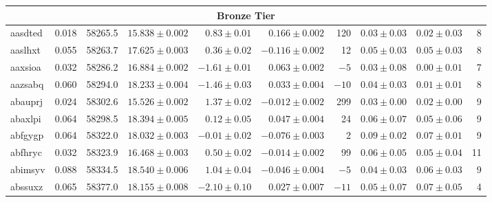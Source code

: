 \documentclass[twocolumn,twocolappendix, linenumbers]{aastex631} %
\begin{document}
\begin{table}[t]
\begin{tabular}{ |l|r|r|r|r|r|r|r|r|r| }
 \hline
 \multicolumn{10}{|c|}{Bronze Tier} \\
 \hline
aasdted & 0.018 & 58265.5 & $15.838 \pm 0.002$ & $0.83 \pm 0.01$ & $0.166 \pm 0.002$ & 120 & $0.03 \pm 0.03$ & $0.02 \pm 0.03$ & 8 \\
aaslhxt & 0.055 & 58263.7 & $17.625 \pm 0.003$ & $0.36 \pm 0.02$ & $-0.116 \pm 0.002$ & 12 & $0.05 \pm 0.03$ & $0.05 \pm 0.03$ & 8 \\
aaxsioa & 0.032 & 58286.2 & $16.884 \pm 0.002$ & $-1.61 \pm 0.01$ & $0.063 \pm 0.002$ & $-5$ & $0.03 \pm 0.08$ & $0.00 \pm 0.01$ & 7 \\
aazsabq & 0.060 & 58294.0 & $18.233 \pm 0.004$ & $-1.46 \pm 0.03$ & $0.033 \pm 0.004$ & $-10$ & $0.04 \pm 0.03$ & $0.01 \pm 0.01$ & 8 \\
abauprj & 0.024 & 58302.6 & $15.526 \pm 0.002$ & $1.37 \pm 0.02$ & $-0.012 \pm 0.002$ & 299 & $0.03 \pm 0.00$ & $0.02 \pm 0.00$ & 9 \\
abaxlpi & 0.064 & 58298.5 & $18.394 \pm 0.005$ & $0.12 \pm 0.05$ & $0.047 \pm 0.004$ & 24 & $0.06 \pm 0.07$ & $0.05 \pm 0.06$ & 9 \\
abfgygp & 0.064 & 58322.0 & $18.032 \pm 0.003$ & $-0.01 \pm 0.02$ & $-0.076 \pm 0.003$ & 2 & $0.09 \pm 0.02$ & $0.07 \pm 0.01$ & 9 \\
abfhryc & 0.032 & 58323.9 & $16.468 \pm 0.003$ & $0.50 \pm 0.02$ & $-0.014 \pm 0.002$ & 99 & $0.06 \pm 0.05$ & $0.05 \pm 0.04$ & 11 \\
abimsyv & 0.088 & 58334.5 & $18.540 \pm 0.006$ & $1.04 \pm 0.04$ & $-0.046 \pm 0.004$ & $-5$ & $0.04 \pm 0.03$ & $0.06 \pm 0.03$ & 9 \\
abssuxz & 0.065 & 58377.0 & $18.155 \pm 0.008$ & $-2.10 \pm 0.10$ & $0.027 \pm 0.007$ & $-11$ & $0.05 \pm 0.07$ & $0.07 \pm 0.05$ & 4 \\


\end{tabular}
\end{table}
\end{document}
